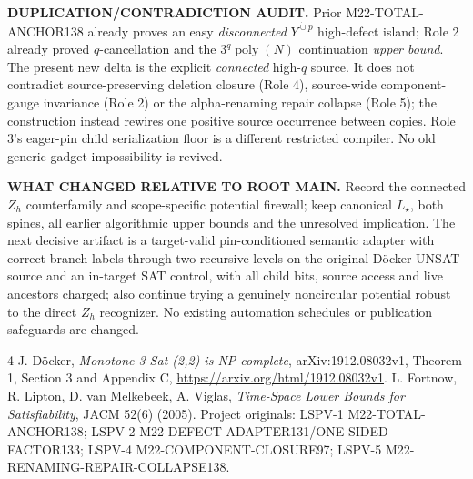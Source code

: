 \documentclass[11pt]{article}
\begin{document}
\noindent\textbf{DUPLICATION/CONTRADICTION AUDIT.} Prior M22-TOTAL-ANCHOR138 already proves an easy \emph{disconnected} \(Y^{\dot\cup p}\) high-defect island; Role 2 already proved \(q\)-cancellation and the \(3^q\operatorname{poly}(N)\) continuation \emph{upper bound}. The present new delta is the explicit \emph{connected} high-\(q\) source. It does not contradict source-preserving deletion closure (Role 4), source-wide component-gauge invariance (Role 2) or the alpha-renaming repair collapse (Role 5); the construction instead rewires one positive source occurrence between copies. Role 3's eager-pin child serialization floor is a different restricted compiler. No old generic gadget impossibility is revived.

\noindent\textbf{WHAT CHANGED RELATIVE TO ROOT MAIN.} Record the connected \(Z_h\) counterfamily and scope-specific potential firewall; keep canonical \(L_\star\), both spines, all earlier algorithmic upper bounds and the unresolved implication. The next decisive artifact is a target-valid pin-conditioned semantic adapter with correct branch labels through two recursive levels on the original D\"ocker UNSAT source and an in-target SAT control, with all child bits, source access and live ancestors charged; also continue trying a genuinely noncircular potential robust to the direct \(Z_h\) recognizer. No existing automation schedules or publication safeguards are changed.
\begin{thebibliography}{4}
 J. D\"ocker, \emph{Monotone 3-Sat-(2,2) is NP-complete}, arXiv:1912.08032v1, Theorem 1, Section 3 and Appendix C, \url{https://arxiv.org/html/1912.08032v1}.
 L. Fortnow, R. Lipton, D. van Melkebeek, A. Viglas, \emph{Time-Space Lower Bounds for Satisfiability}, JACM 52(6) (2005).
 Project originals: LSPV-1 M22-TOTAL-ANCHOR138; LSPV-2 M22-DEFECT-ADAPTER131/ONE-SIDED-FACTOR133; LSPV-4 M22-COMPONENT-CLOSURE97; LSPV-5 M22-RENAMING-REPAIR-COLLAPSE138.
\end{thebibliography}
\end{document}
